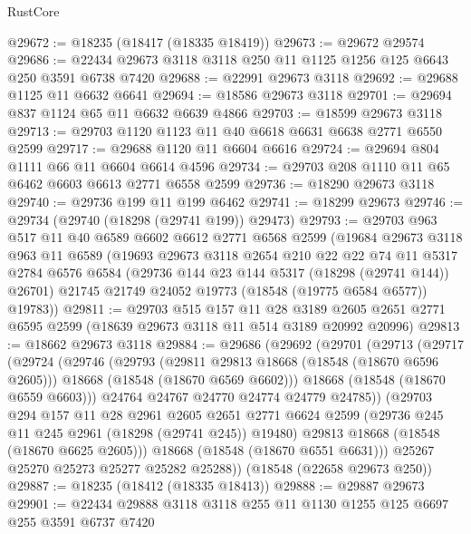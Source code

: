 \begin{lexlean}{RustCore}
\begin{coremodule}
@29672 := @18235 (@18417 (@18335 @18419))
@29673 := @29672 @29574
@29686 := @22434 @29673 @3118 @3118 @250 @11 @1125 @1256 @125 @6643 @250 @3591 @6738 @7420
@29688 := @22991 @29673 @3118
@29692 := @29688 @1125 @11 @6632 @6641
@29694 := @18586 @29673 @3118
@29701 := @29694 @837 @1124 @65 @11 @6632 @6639 @4866
@29703 := @18599 @29673 @3118
@29713 := @29703 @1120 @1123 @11 @40 @6618 @6631 @6638 @2771 @6550 @2599
@29717 := @29688 @1120 @11 @6604 @6616
@29724 := @29694 @804 @1111 @66 @11 @6604 @6614 @4596
@29734 := @29703 @208 @1110 @11 @65 @6462 @6603 @6613 @2771 @6558 @2599
@29736 := @18290 @29673 @3118
@29740 := @29736 @199 @11 @199 @6462
@29741 := @18299 @29673
@29746 := @29734 (@29740 (@18298 (@29741 @199)) @29473)
@29793 := @29703
    @963
    @517
    @11
    @40
    @6589
    @6602
    @6612
    @2771
    @6568
    @2599
    (@19684
      @29673
      @3118
      @963
      @11
      @6589
      (@19693
        @29673
        @3118
        @2654
        @210
        @22
        @22
        @74
        @11
        @5317
        @2784
        @6576
        @6584
        (@29736 @144 @23 @144 @5317 (@18298 (@29741 @144)) @26701)
        @21745
        @21749
        @24052
        @19773
        (@18548 (@19775 @6584 @6577))
        @19783))
@29811 := @29703
    @515
    @157
    @11
    @28
    @3189
    @2605
    @2651
    @2771
    @6595
    @2599
    (@18639 @29673 @3118 @11 @514 @3189 @20992 @20996)
@29813 := @18662 @29673 @3118
@29884 := @29686
    (@29692
      (@29701
        (@29713
          (@29717
            (@29724
              (@29746
                (@29793
                  (@29811 @29813 @18668 (@18548 (@18670 @6596 @2605)))
                  @18668
                  (@18548 (@18670 @6569 @6602)))
                @18668
                (@18548 (@18670 @6559 @6603)))
              @24764
              @24767
              @24770
              @24774
              @24779
              @24785))
          (@29703
            @294
            @157
            @11
            @28
            @2961
            @2605
            @2651
            @2771
            @6624
            @2599
            (@29736 @245 @11 @245 @2961 (@18298 (@29741 @245)) @19480)
            @29813
            @18668
            (@18548 (@18670 @6625 @2605)))
          @18668
          (@18548 (@18670 @6551 @6631)))
        @25267
        @25270
        @25273
        @25277
        @25282
        @25288))
    (@18548 (@22658 @29673 @250))
@29887 := @18235 (@18412 (@18335 @18413))
@29888 := @29887 @29673
@29901 := @22434 @29888 @3118 @3118 @255 @11 @1130 @1255 @125 @6697 @255 @3591 @6737 @7420

\end{coremodule}
\end{lexlean}
